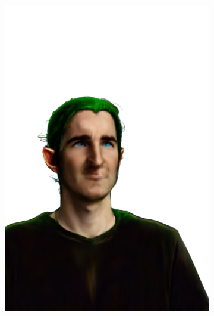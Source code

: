 \begin{figure}[ht]
\begin{subfigure}{0.08\linewidth}
        \includegraphics[width=\textwidth]{Figures/results/high/ephra_elf/11_render.png}

\end{subfigure}
\end{figure}
